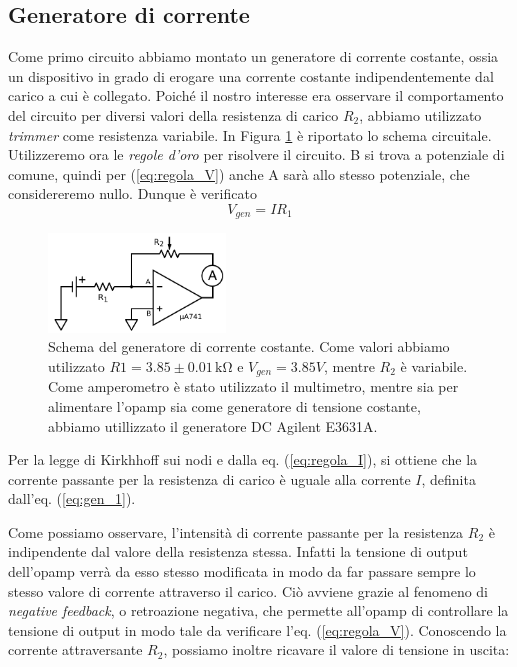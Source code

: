 \subsection{Generatore di corrente}

Come primo circuito abbiamo montato un generatore di corrente costante, ossia un dispositivo in grado di erogare una corrente costante indipendentemente dal carico a cui è collegato.
Poiché il nostro interesse era osservare il comportamento del circuito per diversi valori della resistenza di carico $R_2$, abbiamo utilizzato \textit{trimmer} come resistenza variabile. In Figura \ref{fig:gen_continua} è riportato lo schema circuitale.
Utilizzeremo ora le \textit{regole d'oro} per risolvere il circuito. B si trova a potenziale di comune, quindi per (\ref{eq:regola_V}) anche A sarà allo stesso potenziale, che considereremo nullo. Dunque è verificato
\begin{equation}
V_{gen}=I R_1
\label{eq:gen_1}
\end{equation}

\begin{figure}
  \caption{Schema del generatore di corrente costante. Come valori abbiamo utilizzato $R1=3.85 \pm 0.01 \,\si{\kilo\ohm}$ e $V_{gen}=3.85 V$, mentre $R_2$ è variabile. Come amperometro è stato utilizzato il multimetro, mentre sia per alimentare l'opamp sia come generatore di tensione costante, abbiamo utillizzato il generatore DC Agilent E3631A.}
  \begin{center}
    \includegraphics[width=0.42\textwidth]{../E01/latex/c1.pdf}
  \end{center}
\label{fig:gen_continua}
\end{figure}

Per la legge di Kirkhhoff sui nodi e dalla eq. (\ref{eq:regola_I}), si ottiene che la corrente passante per la resistenza di carico è uguale alla corrente $I$, definita dall'eq. (\ref{eq:gen_1}).

Come possiamo osservare, l'intensità di corrente passante per la resistenza $R_2$ è indipendente dal valore della resistenza stessa. Infatti la tensione di output dell'opamp verrà da esso stesso modificata in modo da far passare sempre lo stesso valore di corrente attraverso il carico.
Ciò avviene grazie al fenomeno di \textit{negative feedback}, o retroazione negativa, che permette all'opamp di controllare la tensione di output in modo tale da verificare l'eq. (\ref{eq:regola_V}).
Conoscendo la corrente attraversante $R_2$, possiamo inoltre ricavare il valore di tensione in uscita:

